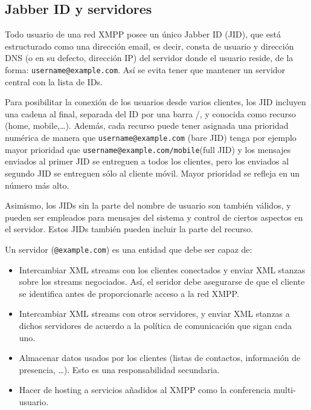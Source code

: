 \documentclass[a4paper, 11pt]{article} %
\begin{document}
  \subsection{Jabber ID y servidores}
    Todo usuario de una red XMPP posee un único Jabber ID (JID), que está estructurado como una dirección email, es decir, 
    consta de usuario y dirección DNS (o en su defecto, dirección IP) del servidor donde el usuario reside, de la forma:
    \texttt{username@example.com}. Así se evita tener que mantener un servidor central con la lista de IDs.
    
    Para posibilitar la conexión de los usuarios desde varios clientes, los JID incluyen una cadena al final, separada
    del ID por una barra /, y conocida como recurso (home, mobile,\ldots). Además, cada recurso puede
    tener asignada una prioridad numérica de manera que \texttt{username@example.com} (bare JID) tenga por ejemplo mayor prioridad que 
    \texttt{username@example.com/mobile}(full JID) y los mensajes enviados al primer JID se entreguen a todos los clientes,
    pero los enviados al segundo JID se entreguen sólo al cliente móvil. Mayor prioridad se refleja en un número más alto.
    
    Asimismo, los JIDs sin la parte del nombre de usuario son también válidos, y pueden ser empleados para mensajes del
    sistema y control de ciertos aspectos en el servidor. Estos JIDs también pueden incluir la parte del recurso.
    
    Un servidor (\texttt{@example.com}) es una entidad que debe ser capaz de:
    \begin{itemize}
     \item Intercambiar XML streams con los clientes conectados y enviar XML stanzas sobre los streams negociados. Así, el
     seridor debe asegurarse de que el cliente se identifica antes de proporcionarle acceso a la red XMPP.
     \item Intercambiar XML streams con otros servidores, y enviar XML stanzas a dichos servidores de acuerdo a la política
     de comunicación que sigan cada uno.
     \item Almacenar datos usados por los clientes (listas de contactos, información de presencia, \ldots). Esto es una
     responsabilidad secundaria.
     \item Hacer de hosting a servicios añadidos al XMPP como la conferencia multi-usuario.
    \end{itemize}
    
\end{document}
